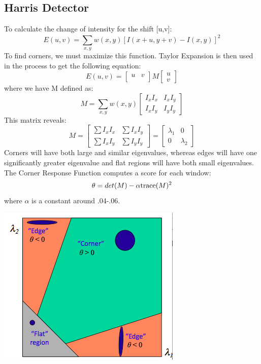 \documentclass{article}
\begin{document}
\subsection{Harris Detector}
To calculate the change of intensity for the shift [u,v]:
$$E(u,v) = \sum_{x,y}^{} w(x,y)[I(x+u,y+v)-I(x,y)]^2$$
To find corners, we must maximize this function. Taylor Expansion is then used in the process to get the following equation:
\[
E(u,v)=
  \begin{bmatrix}
    u & v\\
  \end{bmatrix}
  M
  \begin{bmatrix}
      u \\
      v
    \end{bmatrix}
\]
where we have M defined as:
\[M =
\sum_{x,y}^{} w(x,y)
  \begin{bmatrix}
      I_x I_x & I_x I_y\\
      I_x I_y & I_y I_y
    \end{bmatrix}
\]
This matrix reveals:
\[M =
  \begin{bmatrix}
      \sum I_x I_x & \sum I_x I_y\\
      \sum I_x I_y & \sum I_y I_y
    \end{bmatrix}
    =
    \begin{bmatrix}
      \lambda_1 & 0\\
      0 & \lambda_2
    \end{bmatrix}
\]
Corners will have both large and similar eigenvalues, whereas edges will have one significantly greater eigenvalue and flat regions will have both small eigenvalues.
The Corner Response Function computes a score for each window:
$$\theta = det(M) - \alpha \textnormal{trace} (M)^2 $$
where $\alpha$ is a constant around .04-.06. 
\begin{center}
	\includegraphics[scale=0.5]{eigenvalues_harris.png}\\
\end{center}
\end{document}
